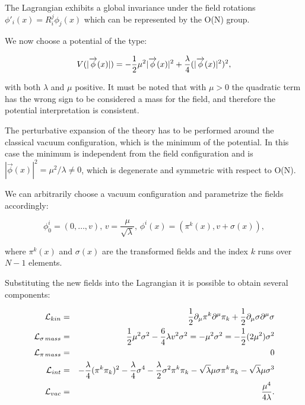 The Lagrangian exhibits a global invariance under the field rotations $\phi'_i(x) = R_i^j \phi_j(x)$ which can be represented by the O(N) group. 

We now choose a potential of the type:

\begin{equation}
V(|\overrightarrow{\phi}(x)|) = - \dfrac{1}{2} \mu^2 |\overrightarrow{\phi}(x)|^2 + \dfrac{\lambda}{4} (|\overrightarrow{\phi}(x)|^2)^2,
\label{eq:lin_sigma}
\end{equation} 

with both $\lambda$ and $\mu$ positive. It must be noted that with $\mu > 0$ the quadratic term has the wrong sign to be considered a mass for the field, and therefore the potential interpretation is consistent.

The perturbative expansion of the theory has to be performed around the classical vacuum configuration, which is the minimum of the potential. In this case the minimum is independent from the field configuration and is $|\vec{\phi}(x)|^2 = \mu^2 / \lambda \neq 0$, which is degenerate and symmetric with respect to O(N).

We can arbitrarily choose a vacuum configuration and parametrize the fields accordingly:

\begin{equation}
\phi_0^i = (0, \ldots, v), \, v= \dfrac{\mu}{\sqrt{\lambda}}, \, \phi^i(x) = (\pi^k(x), v + \sigma(x)),
\end{equation}

where $\pi^k(x)$ and $\sigma(x)$ are the transformed fields and the index $k$ runs over $N-1$ elements. 

Substituting the new fields into the Lagrangian it is possible to obtain several components:

\begin{eqnarray}
\mathcal{L}_{kin} &=& \dfrac{1}{2} \partial_\mu \pi^k \partial^\mu \pi_k + \dfrac{1}{2}  \partial_\mu \sigma \partial^\mu \sigma \nonumber \\
\mathcal{L}_{\sigma \, mass} &=& \dfrac{1}{2} \mu^2 \sigma^2 - \dfrac{6}{4} \lambda v^2 \sigma^2 = - \mu^2 \sigma^2 = -\dfrac{1}{2} (2\mu^2) \sigma^2 \nonumber \\
\mathcal{L}_{\pi \, mass} &=& 0 \nonumber \\
\mathcal{L}_{int} &=& - \dfrac{\lambda}{4} (\pi^k\pi_k)^2 - \dfrac{\lambda}{4} \sigma^4 - \dfrac{\lambda}{2} \sigma^2 \pi^k \pi_k - \sqrt{\lambda} \mu \sigma \pi^k \pi_k - \sqrt{\lambda} \mu \sigma^3 \nonumber \\
\mathcal{L}_{vac} &=& \dfrac{\mu^4}{4\lambda} .
\end{eqnarray}


